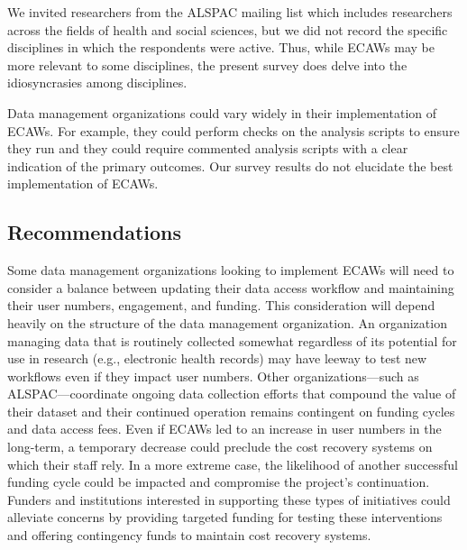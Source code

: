 \documentclass[
  man,floatsintext]{apa6}
\begin{document}
We invited researchers from the ALSPAC mailing list which includes researchers across the fields of health and social sciences, but we did not record the specific disciplines in which the respondents were active. Thus, while ECAWs may be more relevant to some disciplines, the present survey does delve into the idiosyncrasies among disciplines.

Data management organizations could vary widely in their implementation of ECAWs. For example, they could perform checks on the analysis scripts to ensure they run and they could require commented analysis scripts with a clear indication of the primary outcomes. Our survey results do not elucidate the best implementation of ECAWs.

\hypertarget{recommendations}{%
\subsection{Recommendations}\label{recommendations}}

Some data management organizations looking to implement ECAWs will need to consider a balance between updating their data access workflow and maintaining their user numbers, engagement, and funding. This consideration will depend heavily on the structure of the data management organization. An organization managing data that is routinely collected somewhat regardless of its potential for use in research (e.g., electronic health records) may have leeway to test new workflows even if they impact user numbers. Other organizations---such as ALSPAC---coordinate ongoing data collection efforts that compound the value of their dataset and their continued operation remains contingent on funding cycles and data access fees. Even if ECAWs led to an increase in user numbers in the long-term, a temporary decrease could preclude the cost recovery systems on which their staff rely. In a more extreme case, the likelihood of another successful funding cycle could be impacted and compromise the project's continuation. Funders and institutions interested in supporting these types of initiatives could alleviate concerns by providing targeted funding for testing these interventions and offering contingency funds to maintain cost recovery systems.
\end{document}
